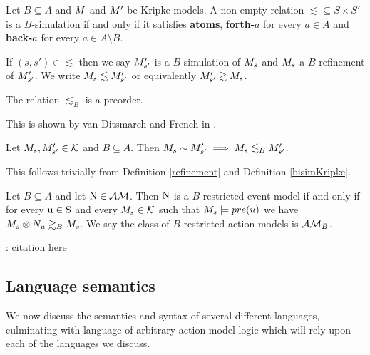 \begin{defn} \label{refinement}
Let $B \subseteq A$ and $M$ and $M'$ be Kripke models. A non-empty relation $\lesssim \subseteq S
\times S'$ is a $B$-simulation if and only if it satisfies {\bf atoms}, {\bf forth-$a$} for
every $a \in A$ and {\bf back-$a$} for every $a \in A \setminus B$.
\end{defn}
If $(s, s') \in \lesssim$ then we say $M'_{s'}$ is a
$B$-simulation of $M_s$ and
$M_s$ a $B$-refinement of $M'_{s'}$.
We write $M_{s} \lesssim M'_{s'}$ or equivalently
$M'_{s'} \gtrsim M_{s}$.

\begin{lemma} \label{refinementPreorder}
The relation $\lesssim_B$ is a preorder.
\end{lemma}
This is shown by van Ditsmarch and French in \cite{van2009simulation}.

\begin{lemma} \label{bisimilarIsRefinement}
Let $M_s, M'_{s'} \in \mathcal{K}$ and $B \subseteq A$.
Then $M_s \sim M'_{s'} \implies M_s \lesssim_B M'_{s'}$.
\end{lemma}

This follows trivially from Definition \ref{refinement} and Definition \ref{bisimKripke}.

\begin{defn} \label{brestrict}
Let $B \subseteq A$ and let $ \mathrm{N}  \in \mathcal{AM}$. Then $ \mathrm{N} $ is a $B$-restricted event model if and
only if for every $ \mathrm{u \in S} $ and every $M_s \in \mathcal{K}$
such that $M_s \models pre(u)$ we
have $M_s \otimes N_u \gtrsim_B M_s$.
We say the class of $B$-restricted action models is $\mathcal{AM}_B$.
\end{defn}

\FIXME: citation here

\subsection{Language semantics}
We now discuss the semantics and syntax of several different languages, culminating with language of
arbitrary action model logic which will rely upon each of the languages we discuss.

